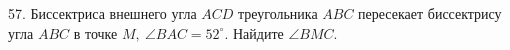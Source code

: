57. Биссектриса внешнего угла $ACD$ треугольника $ABC$ пересекает биссектрису угла $ABC$ в точке $M,\ \angle BAC=52^\circ.$ Найдите $\angle BMC.$\\
